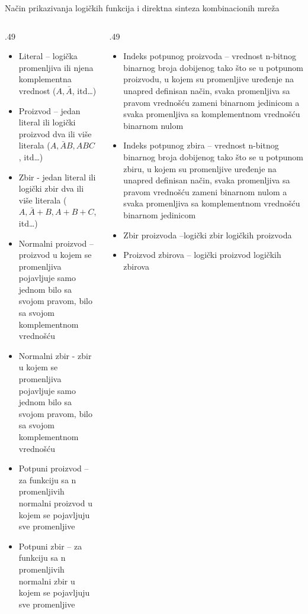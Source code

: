 \begin{frame}[label=02-s009]{Način prikazivanja logičkih funkcija i direktna sinteza kombinacionih mreža}
\gusttekst
\begin{columns}[T,onlytextwidth]
\begin{column}{.49\textwidth}
\begin{itemize}\setlength{\itemsep}{0pt}
\item Literal – logička promenljiva ili njena komplementna vrednost (\(A,\bar A\), itd\ldots)
\item Proizvod – jedan literal ili logički proizvod dva ili više literala (\(A,\bar A B,ABC\), itd\ldots)
\item Zbir - jedan literal ili logički zbir dva ili više literala (\(A,\bar A+B,A+B+C\), itd\ldots)
\item Normalni proizvod –proizvod u kojem se promenljiva pojavljuje samo jednom bilo sa svojom pravom, bilo sa svojom komplementnom vrednošću
\item Normalni zbir - zbir u kojem se promenljiva pojavljuje samo jednom bilo sa svojom pravom, bilo sa svojom komplementnom vrednošću
\item Potpuni proizvod – za funkciju sa n promenljivih normalni proizvod u kojem se pojavljuju sve promenljive
\item Potpuni zbir – za funkciju sa n promenljivih normalni zbir u kojem se pojavljuju sve promenljive
\end{itemize}
\end{column}
\begin{column}{.49\textwidth}
\begin{itemize}\setlength{\itemsep}{0pt}
\item Indeks potpunog proizvoda – vrednost n-bitnog binarnog broja dobijenog tako što se u potpunom proizvodu, u kojem su promenljive uređenje na unapred definisan način, svaka promenljiva sa pravom vrednošću zameni binarnom jedinicom a svaka promenljiva sa komplementnom vrednošću binarnom nulom
\item Indeks potpunog zbira – vrednost n-bitnog binarnog broja dobijenog tako što se u potpunom zbiru, u kojem su promenljive uređenje na unapred definisan način, svaka promenljiva sa pravom vrednošću zameni binarnom nulom a svaka promenljiva sa komplementnom vrednošću binarnom jedinicom
\item Zbir proizvoda –logički zbir logičkih proizvoda
\item Proizvod zbirova – logički proizvod logičkih zbirova
\end{itemize}
\end{column}
\end{columns}
\end{frame}

